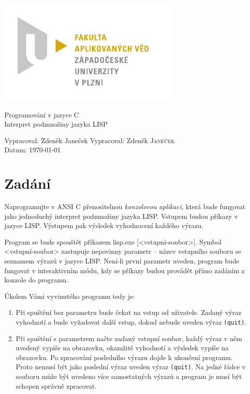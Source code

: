 \documentclass[a4paper, 12pt]{article}
\begin{document}
\begin{titlepage}
\includegraphics[width=40ex]{fav_cmyk}
\vfill
\begin{center}
{\huge Programování v jazyce C}\\[3ex]
{\Large Interpret podmnožiny jazyka LISP}
\end{center}
\vfill
\begin{tabbing}
Vypracoval: \hspace{1ex}\=Zdeněk Janeček\kill
Vypracoval: \>Zdeněk \textsc{Janeček}\\[1ex]
Datum:\> \today
\end{tabbing}
\end{titlepage}

\section{Zadání}
Naprogramujte v ANSI C přenositelnou \emph{konzolovou aplikaci}, která
bude fungovat jako jednoduchý interpret podmnožiny jazyka LISP.
Vstupem budou příkazy v jazyce LISP. Výstupem pak výsledek vyhodnocení
každého výrazu.

Program se bude spouštět příkazem \textsf{lisp.exe} [\textless{}vstupní-soubor\textgreater{}]. Symbol \textless{}vstupní-soubor\textgreater{}
zastupuje nepovinny parametr -- název vstupního souboru
se seznamem výrazů v jazyce LISP. Není-li první parametr uveden,
program bude fungovat v interaktivním módu, kdy se příkazy budou
provádět přímo zadáním z konzole do programu.

Úkolem Vámi vyvinutého programu tedy je:
\begin{enumerate}
\item Při spuštění bez parametru bude čekat na vstup od uživatele.
Zadaný výraz vyhodnotí a bude vyžadovat další vstup, dokud nebude
uveden výraz \texttt{(quit)}.
\item Při spuštění s parametrem načte zadaný vstupní soubor, každý
výraz v něm uvedený vypíše na obrazovku, okamžitě vyhodnotí a
výsledek vypíše na obrazovku. Po zpracování posledního výrazu dojde
k ukončení programu. Proto nemusí být jako poslední výraz uveden výraz
\texttt{(quit)}. Na jedné řádce v souboru může být uvedeno více
samostatných výrazů a program je musí být schopen správně zpracovat.
\end{enumerate}
\end{document}
